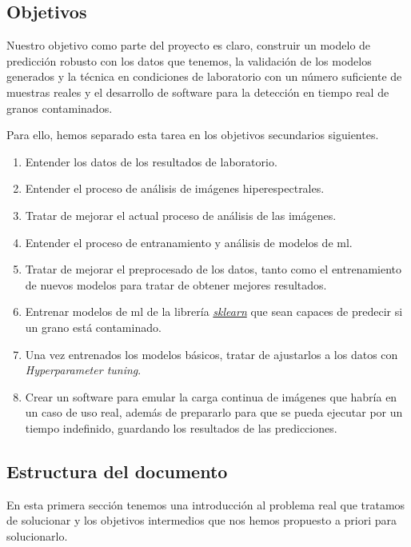 \subsection{Objetivos}

Nuestro objetivo como parte del proyecto es claro, construir un modelo de predicción robusto con los datos que tenemos, la validación de los modelos generados y la técnica en
condiciones de laboratorio con un número suficiente de muestras reales y el desarrollo de software para la detección en tiempo real de granos contaminados. 

Para ello, hemos separado esta tarea en los objetivos secundarios siguientes. 

\begin{enumerate}
    \item Entender los datos de los resultados de laboratorio.
    \item Entender el proceso de análisis de imágenes hiperespectrales.
    \item Tratar de mejorar el actual proceso de análisis de las imágenes.
    \item Entender el proceso de entranamiento y análisis de modelos de \gls{ml}.
    \item Tratar de mejorar el preprocesado de los datos, tanto como el entrenamiento de nuevos modelos para tratar de obtener mejores resultados.
    \item Entrenar modelos de \gls{ml} de la librería \textit{\href{https://scikit-learn.org/stable/}{sklearn}} que sean capaces de predecir si un grano está contaminado. 
    \item Una vez entrenados los modelos básicos, tratar de ajustarlos a los datos con \textit{Hyperparameter tuning}.
    \item Crear un software para emular la carga continua de imágenes que habría en un caso de uso real, además de prepararlo para que se pueda ejecutar por un tiempo indefinido, guardando los resultados de las predicciones.
\end{enumerate}

\subsection{Estructura del documento}

En esta primera sección tenemos una introducción al problema real que tratamos de solucionar y los objetivos intermedios que nos hemos propuesto a priori para solucionarlo.

